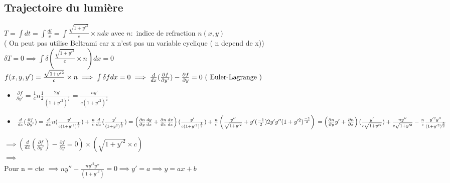 \documentclass[12pt,oneside]{book}
\begin{document}
\subsection{Trajectoire du lumière }
\begin{small}
$ T = \int dt = \int \frac{dl}{v} = \int \frac{\sqrt{1+y'^2}}{c}\times n dx $ avec $ n :\text{ indice de refraction } n(x,y) $ \\
( On peut pas utilise Beltrami car x n'est pas un variable cyclique ( n depend de x))\\
$ \delta T = 0 \implies \int \delta \left( \frac{\sqrt{1+y'^2}}{c} \times n \right)dx = 0 $ \\
$ f(x,y,y') = \frac{\sqrt{1+y'^2}}{c}\times n \implies \int\delta f dx =0 \\
	\implies \frac{d}{dx}(\frac{\partial f}{\partial y'}) - \frac{\partial f}{\partial y}  = 0 \text{ ( Euler-Lagrange )}\\
$
\begin{itemize}
	\item   $ \frac{\partial f}{\partial y'} = \frac{1}{c}n\frac{1}{2}\frac{2y'}{(1+y'^2)^{\frac{1}{2}}} = \frac{ny'}{c(1+y'^2)^{\frac{1}{2}}} $
	\item $\frac{d}{dx}(\frac{\partial f}{\partial y'}) = \frac{d}{dx}n(\frac{y'}{c(1+y'^2)^{\frac{1}{2}}}) + \frac{n}{c}\frac{d}{dx}(\frac{y'}{(1+y^2)^{\frac{1}{2}}}) \\
		      =\left( \frac{\partial n}{\partial y}\frac{dy}{dx} + \frac{\partial n}{\partial x}\frac{dx}{dx} \right)(\frac{y'}{c(1+y'^2)^{\frac{1}{2}}})+ \frac{n}{c}\left( \frac{y''}{\sqrt{1+y'^2}}+y'(\frac{-1}{2})2y'y''(1+y'^2)^{\frac{-3}{2}} \right)\\
		      = \left( \frac{\partial n}{\partial y}y' +\frac{\partial n}{\partial x} \right)(\frac{y'}{c\sqrt{1+y'^2}}) + \frac{ny''}{c\sqrt{1+y'^2}}-\frac{n}{c}\frac{y'^2y''}{(1+y'^2)^{\frac{3}{2}}}
	      $
\end{itemize}
$ \implies \left( \frac{d}{dx}(\frac{\partial f}{\partial y'}) - \frac{\partial f}{\partial y} = 0 \right) \times(\sqrt{1+y'^2}\times c)  $\\
$ \implies $  \\
Pour n = cte $ \implies ny'' - \frac{ny'^2y''}{(1+y'^2)} = 0 \implies y' =a \implies y = ax+b $
\end{small}
\end{document}
